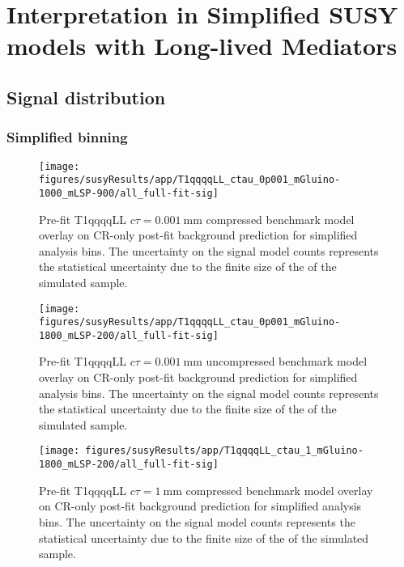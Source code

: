 \section{Interpretation in Simplified SUSY models with Long-lived Mediators}
\label{app:LLP}

\subsection{Signal distribution}
\label{app:susyll-mr-plots}

\subsubsection{Simplified binning}

\begin{figure}[h!]
    \begin{center}
        \texttt{[image: figures/susyResults/app/T1qqqqLL\_ctau\_0p001\_mGluino-1000\_mLSP-900/all\_full-fit-sig]}
        \caption{
            Pre-fit T1qqqqLL $c\tau=0.001~\mathrm{mm}$ compressed benchmark
            model overlay on CR-only post-fit background prediction for
            simplified analysis bins. The uncertainty on the signal model counts
            represents the statistical uncertainty due to the finite size of the
            of the simulated sample.
        }
        \label{fig:T1qqqqLL_ctau_0p001_compressed_MR_simp}
    \end{center}
\end{figure}

\begin{figure}[h!]
    \begin{center}
        \texttt{[image: figures/susyResults/app/T1qqqqLL\_ctau\_0p001\_mGluino-1800\_mLSP-200/all\_full-fit-sig]}
        \caption{
            Pre-fit T1qqqqLL $c\tau=0.001~\mathrm{mm}$ uncompressed benchmark
            model overlay on CR-only post-fit background prediction for
            simplified analysis bins. The uncertainty on the signal model counts
            represents the statistical uncertainty due to the finite size of the
            of the simulated sample.
        }
        \label{fig:T1qqqqLL_ctau_0p001_uncompressed_MR_simp}
    \end{center}
\end{figure}

\begin{figure}[h!]
    \begin{center}
        \texttt{[image: figures/susyResults/app/T1qqqqLL\_ctau\_1\_mGluino-1800\_mLSP-200/all\_full-fit-sig]}
        \caption{
            Pre-fit T1qqqqLL $c\tau=1~\mathrm{mm}$ compressed benchmark
            model overlay on CR-only post-fit background prediction for
            simplified analysis bins. The uncertainty on the signal model counts
            represents the statistical uncertainty due to the finite size of the
            of the simulated sample.
        }
        \label{fig:T1qqqqLL_ctau_1_compressed_MR_simp}
    \end{center}
\end{figure}

